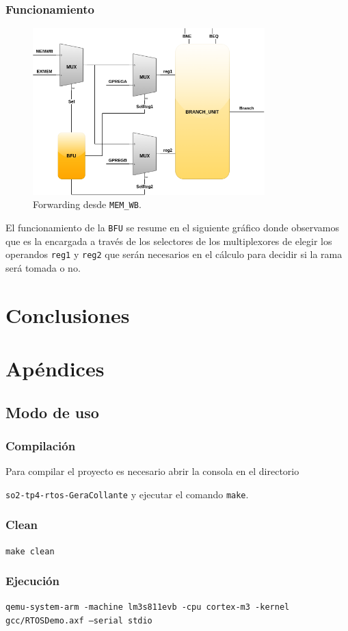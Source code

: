 \documentclass[a4paper]{article}
\begin{document}
\subsubsection{Funcionamiento}

\begin{figure}[H]
	\begin{center}				
	\includegraphics[width=0.8\textwidth,center]{BFU2.png}
  	\caption{Forwarding desde \texttt{MEM\_WB}.}
  	\label{fig:funcionamiento.}
  	\end{center}
\end{figure}

El funcionamiento de la \texttt{BFU} se resume en el siguiente gráfico donde observamos que es la encargada a través de los selectores de los multiplexores de elegir los operandos \texttt{reg1} y \texttt{reg2} que serán necesarios en el cálculo para decidir si la rama será tomada o no.

\section{Conclusiones}


\section{Apéndices}

\subsection{Modo de uso}

\subsubsection{Compilación}
Para compilar el proyecto es necesario abrir la consola en el directorio 

\texttt{so2-tp4-rtos-GeraCollante} y ejecutar el comando \texttt{make}.

\subsubsection{Clean}
\texttt{make clean}

\subsubsection{Ejecución}
\texttt{qemu-system-arm -machine lm3s811evb -cpu cortex-m3 -kernel gcc/RTOSDemo.axf --serial stdio}

\clearpage

\nocite{*}
\end{document}
